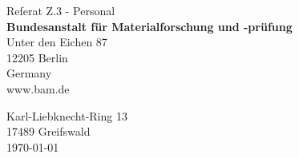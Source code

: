 \documentclass[11pt,a4paper]{moderncv}
\begin{document}
	\vspace*{1.0cm}
	\begin{minipage}{0.6\textwidth}
		\begin{flushleft}
			Referat Z.3 - Personal\\[0.2cm]
			{\bfseries{\color{firstnamecolor}%
				Bundesanstalt für Materialforschung und -prüfung%
			}}\\[0.2cm]
			Unter den Eichen 87\\
			12205 Berlin\\
			Germany\\
			www.bam.de\\
		\end{flushleft}
	\end{minipage}
	\hfill
	\begin{minipage}{0.3\textwidth}
		\begin{flushright}
			\vspace*{1.3cm}
			Karl-Liebknecht-Ring 13\\
			17489 Greifswald\\[1.0cm]
			\today
		\end{flushright}
	\end{minipage}
	
\end{document}
